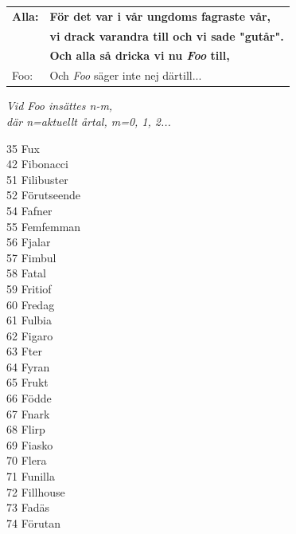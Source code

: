 \documentclass[a6paper, 10pt, twoside]{article}
\begin{document}
\noindent
\begin{center}
\end{center}
\begin{lyrics}
\vspace{-15pt}
\begin{table}[!h]
\begin{tabularx}{0.75\textwidth}{l l}
\textbf{\small Alla:} & \textbf{\small För det var i vår ungdoms fagraste vår, }\\
 &\textbf{\small vi drack varandra till och vi sade "gutår".}\\
 &\textbf{\small Och alla så dricka vi nu \textit{Foo} till,}\\
\small Foo: &\small Och \textit{Foo} säger inte nej därtill...
\end{tabularx}\physicalonly{\vspace{-20pt}}\end{table}
\begin{center}
\textit{Vid Foo insättes n-m,\\där n=aktuellt årtal, m=0, 1, 2...}
\end{center}%
\begin{minipage}[t]{0.3\textwidth}\small
35 Fux\\
42 Fibonacci\\
51 Filibuster\\
52 Förutseende\\
54 Fafner\\
55 Femfemman\\
56 Fjalar\\
57 Fimbul\\
58 Fatal\\
59 Fritiof\\
60 Fredag\\
61 Fulbia\\
62 Figaro\\
63 Fter\\
64 Fyran\\
65 Frukt\\
66 Födde\\
67 Fnark\\
68 Flirp\\
69 Fiasko\\
70 Flera\\
71 Funilla\\
72 Fillhouse \\
73 Fadäs\\
74 Förutan

\end{minipage}
\end{lyrics}
\end{document}
